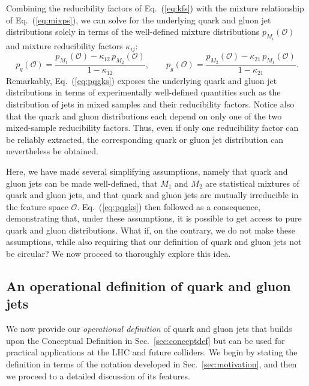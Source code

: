 \documentclass[letterpaper,11pt]{article}
\DeclareRobustCommand{\Sec}[1]{Sec.~\ref{#1}}
\DeclareRobustCommand{\Eq}[1]{Eq.~(\ref{#1})}
\renewcommand{\O}{\mathcal{O}}
\begin{document}
Combining the reducibility factors of \Eq{eq:kfs} with the mixture relationship of \Eq{eq:mixps}, we can solve for the underlying quark and gluon jet distributions solely in terms of the well-defined mixture distributions $p_{M_i}(\mathcal O)$ and mixture reducibility factors $\kappa_{ij}$:
\begin{equation}
\label{eq:pqgks}
p_q(\O)=\frac{p_{M_1}(\O)-\kappa_{12}\,p_{M_2}(\O)}{1-\kappa_{12}},\quad\quad p_g(\O)=\frac{p_{M_2}(\O)-\kappa_{21}\,p_{M_1}(\O)}{1-\kappa_{21}}.
\end{equation}
%
Remarkably, \Eq{eq:pqgks} exposes the underlying quark and gluon jet distributions in terms of experimentally well-defined quantities such as the distribution of jets in mixed samples and their reducibility factors.
%
Notice also that the quark and gluon distributions each depend on only one of the two mixed-sample reducibility factors. 
%
Thus, even if only one reducibility factor can be reliably extracted, the corresponding quark or gluon jet distribution can nevertheless be obtained.

Here, we have made several simplifying assumptions, namely that quark and gluon jets can be made well-defined, that $M_1$ and $M_2$ are statistical mixtures of quark and gluon jets, and that quark and gluon jets are mutually irreducible in the feature space $\O$.
%
\Eq{eq:pqgks} then followed as a consequence, demonstrating that, under these assumptions, it is possible to get access to pure quark and gluon distributions.
%
What if, on the contrary, we do not make these assumptions, while also requiring that our definition of quark and gluon jets not be circular?
%
We now proceed to thoroughly explore this idea.



\subsection{An operational definition of quark and gluon jets}
\label{sec:opdef}


We now provide our \emph{operational definition} of quark and gluon jets that builds upon the Conceptual Definition in \Sec{sec:conceptdef} but can be used for practical applications at the LHC and future colliders.
%
We begin by stating the definition in terms of the notation developed in \Sec{sec:motivation}, and then we proceed to a detailed discussion of its features.
\end{document}
